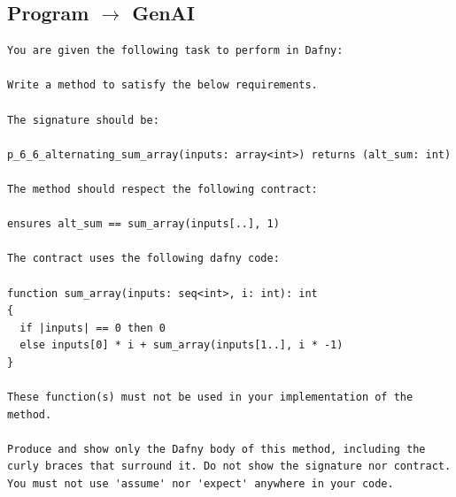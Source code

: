 \documentclass{article}
\begin{document}
\subsection*{Program $\rightarrow$ GenAI}
\begin{lstlisting}
You are given the following task to perform in Dafny:

Write a method to satisfy the below requirements.

The signature should be:

p_6_6_alternating_sum_array(inputs: array<int>) returns (alt_sum: int)

The method should respect the following contract:

ensures alt_sum == sum_array(inputs[..], 1)

The contract uses the following dafny code:

function sum_array(inputs: seq<int>, i: int): int
{
  if |inputs| == 0 then 0
  else inputs[0] * i + sum_array(inputs[1..], i * -1)
}

These function(s) must not be used in your implementation of the method.

Produce and show only the Dafny body of this method, including the curly braces that surround it. Do not show the signature nor contract. You must not use 'assume' nor 'expect' anywhere in your code.
\end{lstlisting}
\end{document}
